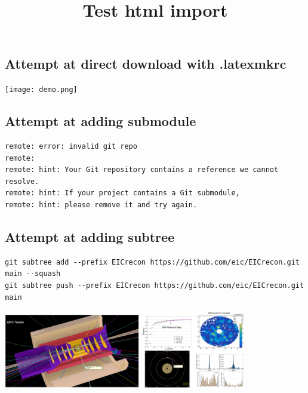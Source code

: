 \documentclass{article}
\title{Test html import}
\begin{document}
\maketitle

\subsection*{Attempt at direct download with .latexmkrc}
%
\immediate{}
\immediate{}


\texttt{[image: demo.png]}

\subsection*{Attempt at adding submodule}

\begin{verbatim}
remote: error: invalid git repo
remote: 
remote: hint: Your Git repository contains a reference we cannot resolve.
remote: hint: If your project contains a Git submodule,
remote: hint: please remove it and try again.
\end{verbatim}

\subsection*{Attempt at adding subtree}

\begin{verbatim}
git subtree add --prefix EICrecon https://github.com/eic/EICrecon.git main --squash
git subtree push --prefix EICrecon https://github.com/eic/EICrecon.git main
\end{verbatim}

\includegraphics[width=0.8\textwidth]{EICrecon/docs/demo.png}
\end{document}
